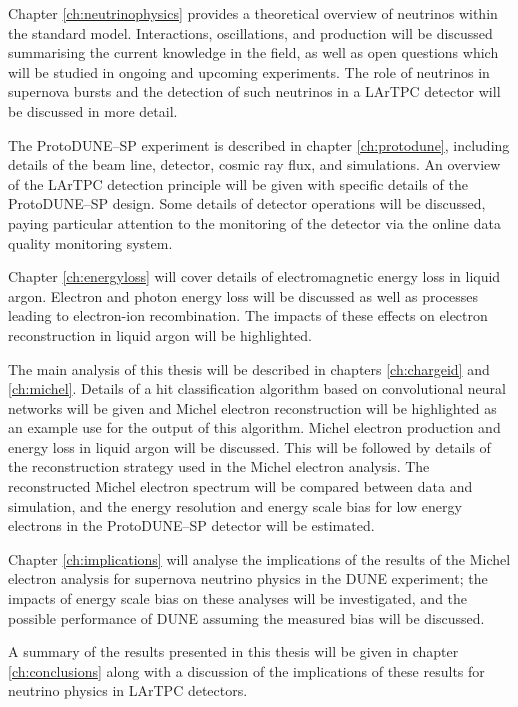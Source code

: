 Chapter \ref{ch:neutrinophysics} provides a theoretical overview of neutrinos
within the standard model. Interactions, oscillations, and production will be
discussed summarising the current knowledge in the field, as well as open
questions which will be studied in ongoing and upcoming experiments. The role of
neutrinos in supernova bursts and the detection of such neutrinos in a LArTPC
detector will be discussed in more detail.

The ProtoDUNE--SP experiment is described in chapter \ref{ch:protodune},
including details of the beam line, detector, cosmic ray flux, and simulations.
An overview of the LArTPC detection principle will be given with specific
details of the ProtoDUNE--SP design. Some details of detector operations will be
discussed, paying particular attention to the monitoring of the detector via the
online data quality monitoring system.

Chapter \ref{ch:energyloss} will cover details of electromagnetic energy loss
in liquid argon. Electron and photon energy loss will be discussed as well as
processes leading to electron-ion recombination. The impacts of these effects on
electron reconstruction in liquid argon will be highlighted.

The main analysis of this thesis will be described in chapters
\ref{ch:chargeid} and \ref{ch:michel}. Details of a hit classification
algorithm based on convolutional neural networks will be given and Michel
electron reconstruction will be highlighted as an example use for the output of
this algorithm. Michel electron production and energy loss in liquid argon will
be discussed. This will be followed by details of the reconstruction strategy
used in the Michel electron analysis. The reconstructed Michel electron spectrum
will be compared between data and simulation, and the energy resolution and
energy scale bias for low energy electrons in the ProtoDUNE--SP detector will be
estimated. 

Chapter \ref{ch:implications} will analyse the implications of the results of
the Michel electron analysis for supernova neutrino physics in the DUNE
experiment; the impacts of energy scale bias on these analyses will be
investigated, and the possible performance of DUNE assuming the measured bias
will be discussed.

A summary of the results presented in this thesis will be given in chapter
\ref{ch:conclusions} along with a discussion of the implications of these
results for neutrino physics in LArTPC detectors.

